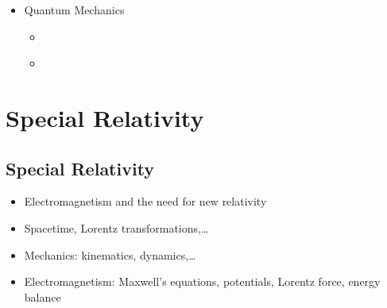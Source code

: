 \documentclass[letterpaper,10pt,english]{jupyterBook}
\begin{document}
\begin{itemize}
\item {} 
\sphinxAtStartPar
Quantum Mechanics

\begin{itemize}
\item {} 
\sphinxAtStartPar
{\hyperref[\detokenize{ch/quantum-mechanics/intro::doc}]{}}

\item {} 
\sphinxAtStartPar
{\hyperref[\detokenize{ch/quantum-mechanics/notes::doc}]{}}

\end{itemize}
\end{itemize}

\sphinxstepscope


\part{Special Relativity}

\sphinxstepscope


\chapter{Special Relativity}
\label{\detokenize{ch/relativity-special/intro:special-relativity}}\label{\detokenize{ch/relativity-special/intro:relativity-special}}\label{\detokenize{ch/relativity-special/intro::doc}}\begin{itemize}
\item {} 
\sphinxAtStartPar
Electromagnetism and the need for new relativity

\item {} 
\sphinxAtStartPar
Space\sphinxhyphen{}time, Lorentz transformations,…

\item {} 
\sphinxAtStartPar
Mechanics: kinematics, dynamics,…

\item {} 
\sphinxAtStartPar
Electromagnetism: Maxwell’s equations, potentials, Lorentz force, energy balance

\end{itemize}

\sphinxstepscope
\end{document}
